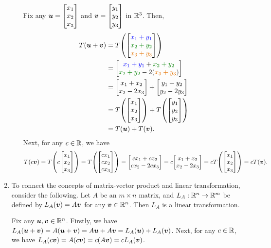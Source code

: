 \begin{enumerate}
\begin{itemize}
\begin{pf}
Fix any \(\vect{u}=\mqty[x_1\\ x_2\\ x_3]\) and \(\vect{v}=\mqty[y_1\\ y_2\\
y_3]\) in \(\mathbb{R}^3\). Then,
\begin{align*}
T(\vect{u}+\vect{v})
&=T\qty(\mqty[\blc{x_1+y_1}\\ \gc{x_2+y_2}\\ \orc{x_3+y_3}]) \\
&=\mqty[\blc{x_1+y_1}+\gc{x_2+y_2}\\ \gc{x_2+y_2}-2(\orc{x_3+y_3})] \\
&=\mqty[x_1+x_2\\ x_2-2x_3]+\mqty[y_1+y_2\\ y_2-2y_3] \\
&=T\qty(\mqty[x_1\\ x_2\\ x_3])+T\qty(\mqty[y_1\\ y_2\\ y_3]) \\
&=T(\vect{u})+T(\vect{v}).
\end{align*}
Next, for any \(c\in\mathbb{R}\), we have
\[
T(c\vect{v})
=T\qty(c\mqty[x_1\\ x_2\\ x_3])
=T\qty(\mqty[cx_1\\ cx_2\\ cx_3])
=\mqty[cx_1+cx_2\\ cx_2-2cx_3]
=c\mqty[x_1+x_2\\ x_2-2x_3]
=cT\qty(\mqty[x_1\\ x_2\\ x_3])
=cT(\vect{v}).
\]
\end{pf}
\end{itemize}
\item \label{it:matx-mult-lt} To connect the concepts of matrix-vector product and linear
transformation, consider the following. Let \(A\) be an \(m\times n\) matrix,
and \(L_A:\mathbb{R}^n\to\mathbb{R}^m\) be defined by \(L_A(\vb*{v})=A\vb*{v}\) for any \(\vb*{v}\in\mathbb{R}^n\).
Then \(L_A\) is a linear transformation.

\begin{pf}
Fix any \(\vb*{u},\vb*{v}\in\mathbb{R}^n\). Firstly, we have
\(L_A(\vb*{u}+\vb*{v})=A(\vb*{u}+\vb*{v})=A\vb*{u}+A\vb*{v}=L_A(\vb*{u})+L_A(\vb*{v})\).
Next, for any \(c\in\mathbb{R}\), we have
\(L_A(c\vb*{v})=A(c\vb*{v})=c(A\vb*{v})=cL_A(\vb*{v})\).
\end{pf}


\end{enumerate}
